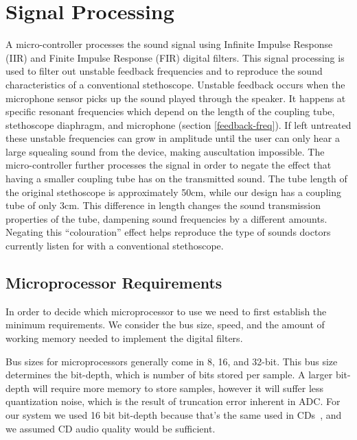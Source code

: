 \section{Signal Processing}
A micro-controller processes the sound signal using Infinite Impulse Response (IIR) and Finite Impulse Response (FIR) digital filters. This signal processing is used to filter out unstable feedback frequencies and to reproduce the sound characteristics of a conventional stethoscope. Unstable feedback occurs when the microphone sensor picks up the sound played through the speaker. It happens at specific resonant frequencies which depend on the length of the coupling tube, stethoscope diaphragm, and microphone (section \ref{feedback-freq}). If left untreated these unstable frequencies can grow in amplitude until the user can only hear a large squealing sound from the device, making auscultation impossible. The micro-controller further processes the signal in order to negate the effect that having a smaller coupling tube has on the transmitted sound. The tube length of the original stethoscope is approximately 50cm, while our design has a coupling tube of only 3cm. This difference in length changes the sound transmission properties of the tube, dampening sound frequencies by a different amounts. Negating this ``colouration'' effect helps reproduce the type of sounds doctors currently listen for with a conventional stethoscope.

\subsection{Microprocessor Requirements} \label{mcu-requirements}
In order to decide which microprocessor to use we need to first establish the minimum requirements. We consider the bus size, speed, and the amount of working memory needed to implement the digital filters.

Bus sizes for microprocessors generally come in 8, 16, and 32-bit. This bus size determines the bit-depth, which is number of bits stored per sample. A larger bit-depth will require more memory to store samples, however it will suffer less quantization noise, which is the result of truncation error inherent in ADC. For our system we used 16 bit bit-depth because that's the same used in CDs~\cite[p.~27]{Schroder2011}, and we assumed CD audio quality would be sufficient.

